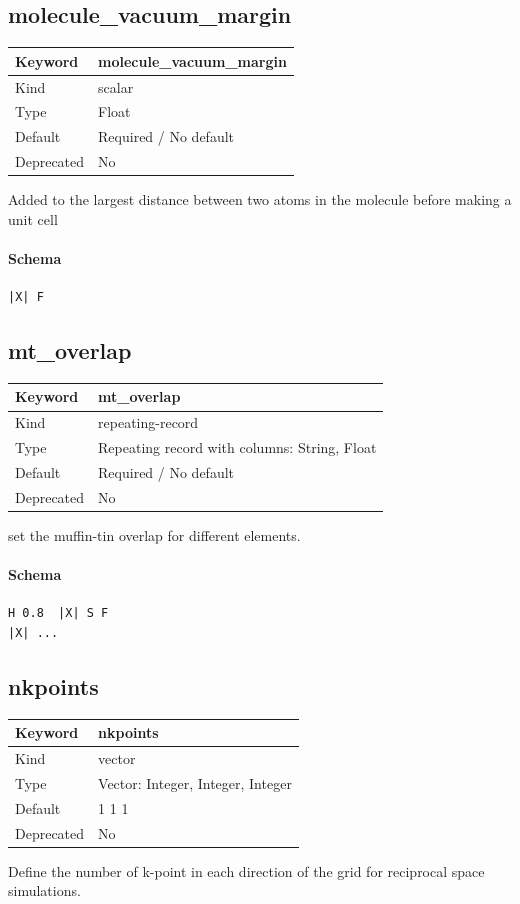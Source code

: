 \documentclass[11pt]{article}
\begin{document}
\subsection{molecule\_vacuum\_margin}
\label{kw:molecule-vacuum-margin}
\begin{longtable}{|p{1.5in}|p{4.5in}|}
\hline
Keyword & molecule\_vacuum\_margin \\
\hline
Kind & scalar \\
\hline
Type & Float \\
\hline
Default & Required / No default \\
\hline
Deprecated & No \\
\hline
\end{longtable}
 Added to the largest distance between two atoms in the
 molecule before making a unit cell

\paragraph{Schema}
\begin{Verbatim}
|X| F
\end{Verbatim}

\subsection{mt\_overlap}
\label{kw:mt-overlap}
\begin{longtable}{|p{1.5in}|p{4.5in}|}
\hline
Keyword & mt\_overlap \\
\hline
Kind & repeating-record \\
\hline
Type & Repeating record with columns: String, Float \\
\hline
Default & Required / No default \\
\hline
Deprecated & No \\
\hline
\end{longtable}
 set the muffin-tin overlap for different elements.

\paragraph{Schema}
\begin{Verbatim}
H 0.8  |X| S F
|X| ...
\end{Verbatim}

\subsection{nkpoints}
\label{kw:nkpoints}
\begin{longtable}{|p{1.5in}|p{4.5in}|}
\hline
Keyword & nkpoints \\
\hline
Kind & vector \\
\hline
Type & Vector: Integer, Integer, Integer \\
\hline
Default & 1 1 1 \\
\hline
Deprecated & No \\
\hline
\end{longtable}
 Define the number of k-point in each direction of the grid for reciprocal
 space simulations.
\end{document}
